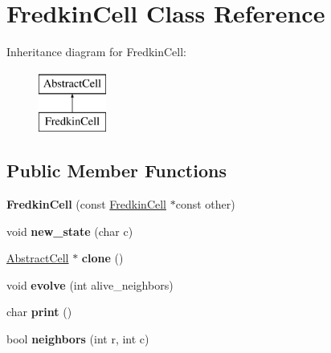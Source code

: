 \hypertarget{classFredkinCell}{\section{\-Fredkin\-Cell \-Class \-Reference}
\label{classFredkinCell}
}
\-Inheritance diagram for \-Fredkin\-Cell\-:\begin{figure}[H]
\begin{center}
\leavevmode
\includegraphics[height=2.000000cm]{classFredkinCell}
\end{center}
\end{figure}
\subsection*{\-Public \-Member \-Functions}
\begin{DoxyCompactItemize}
\item 
\hypertarget{classFredkinCell_ae7203441753c4765206f8ef32c74809d}{{\bfseries \-Fredkin\-Cell} (const \hyperlink{classFredkinCell}{\-Fredkin\-Cell} $\ast$const other)}\label{classFredkinCell_ae7203441753c4765206f8ef32c74809d}

\item 
\hypertarget{classFredkinCell_a4eb96b2c345a801c42ca4668d2c0c609}{void {\bfseries new\-\_\-state} (char c)}\label{classFredkinCell_a4eb96b2c345a801c42ca4668d2c0c609}

\item 
\hypertarget{classFredkinCell_ad272f22e99f6c0a2442b051426974154}{\hyperlink{classAbstractCell}{\-Abstract\-Cell} $\ast$ {\bfseries clone} ()}\label{classFredkinCell_ad272f22e99f6c0a2442b051426974154}

\item 
\hypertarget{classFredkinCell_afe9d77f93030dce61291f79b49c5b4f4}{void {\bfseries evolve} (int alive\-\_\-neighbors)}\label{classFredkinCell_afe9d77f93030dce61291f79b49c5b4f4}

\item 
\hypertarget{classFredkinCell_ab536a983906dce19907404585d0855f1}{char {\bfseries print} ()}\label{classFredkinCell_ab536a983906dce19907404585d0855f1}

\item 
\hypertarget{classFredkinCell_af95f19ca4b8a15a27cb0739c2dfe4e10}{bool {\bfseries neighbors} (int r, int c)}\label{classFredkinCell_af95f19ca4b8a15a27cb0739c2dfe4e10}

\end{DoxyCompactItemize}
